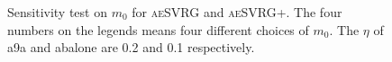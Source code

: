 \documentclass[conference]{IEEEtran}
\begin{document}
 \begin{figure}[ht]
 \label{aeSVRG_aeSVRG+}
\centering
{}
\caption{Sensitivity test on $m_0$ for \textsc{aeSVRG} and \textsc{aeSVRG+}. The four numbers on the legends means four different choices of $m_0$. The $\eta$ of a9a and abalone are 0.2 and 0.1 respectively.}

\end{figure}
\end{document}
